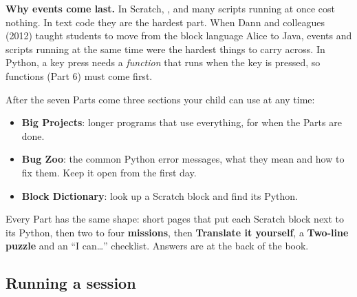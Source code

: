 \textbf{Why events come last.} In Scratch, ,  and many scripts running at once cost nothing. In text code they are the hardest part. When Dann and colleagues (2012) taught students to move from the block language Alice to Java, events and scripts running at the same time were the hardest things to carry across. In Python, a key press needs a \emph{function} that runs when the key is pressed, so functions (Part 6) must come first.

After the seven Parts come three sections your child can use at any time:
\begin{itemize}
  \item \textbf{Big Projects}: longer programs that use everything, for when the Parts are done.
  \item \textbf{Bug Zoo}: the common Python error messages, what they mean and how to fix them. Keep it open from the first day.
  \item \textbf{Block Dictionary}: look up a Scratch block and find its Python.
\end{itemize}

Every Part has the same shape: short pages that put each Scratch block next to its Python, then two to four \textbf{missions}, then \textbf{Translate it yourself}, a \textbf{Two-line puzzle} and an ``I can\ldots'' checklist. Answers are at the back of the book.

\subsection*{Running a session}

